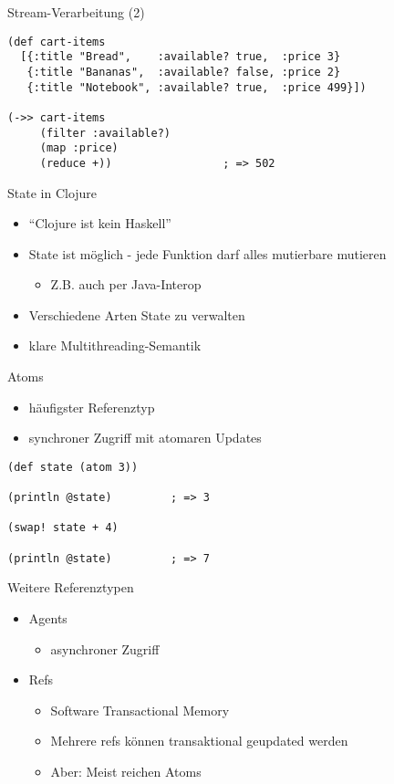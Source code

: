 \documentclass[presentation]{beamer}
\begin{document}
\begin{frame}[fragile]{Stream-Verarbeitung (2)}
  \begin{block}{}
\begin{verbatim}
(def cart-items
  [{:title "Bread",    :available? true,  :price 3}
   {:title "Bananas",  :available? false, :price 2}
   {:title "Notebook", :available? true,  :price 499}])

(->> cart-items
     (filter :available?)
     (map :price)
     (reduce +))                 ; => 502

\end{verbatim}
  \end{block}
\end{frame}

\begin{frame}[fragile]{State in Clojure}
  \begin{itemize}
  \item ``Clojure ist kein Haskell''
  \item State ist möglich - jede Funktion darf alles mutierbare mutieren
    \begin{itemize}
    \item Z.B. auch per Java-Interop
    \end{itemize}
  \item Verschiedene Arten State zu verwalten
  \item klare Multithreading-Semantik
  \end{itemize}
\end{frame}

\begin{frame}[fragile]{Atoms}
  \begin{itemize}
  \item häufigster Referenztyp
  \item synchroner Zugriff mit atomaren Updates
  \end{itemize}
\begin{verbatim}
(def state (atom 3))

(println @state)         ; => 3

(swap! state + 4)

(println @state)         ; => 7
\end{verbatim}
\end{frame}

\begin{frame}{Weitere Referenztypen}
  \begin{itemize}
  \item Agents
    \begin{itemize}
    \item asynchroner Zugriff
    \end{itemize}
  \item Refs
    \begin{itemize}
    \item Software Transactional Memory
    \item Mehrere refs können transaktional geupdated werden
    \item Aber: Meist reichen Atoms
    \end{itemize}
  \end{itemize}
\end{frame}
\end{document}

